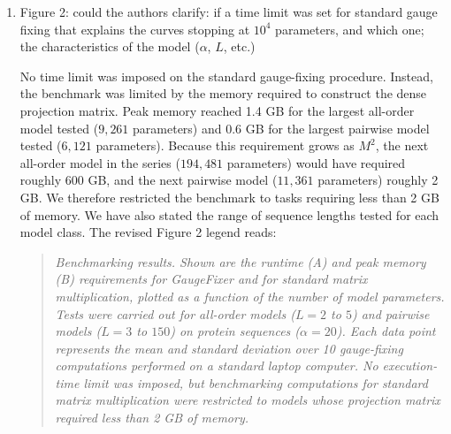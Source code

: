 \documentclass[11pt]{article}
\newenvironment{response}{\par\color{responseblue}}{\par}
\newenvironment{msquote}
  {\begin{quote}\color{responseblue}\itshape\noindent\ignorespaces}
  {\end{quote}}
\begin{document}
\begin{enumerate}
\begin{response}
We have revised the Discussion to emphasize this point:
\end{response}

\begin{msquote}
Although GaugeFixer operates only on specific classes of linear models
(all-order and hierarchical models), it can still be used to characterize
nonparametric or nonlinear models (e.g., Gaussian process models or deep neural
networks). To do this, one first evaluates the model of interest on every
possible sequence. The resulting landscape is then represented as an all-order
model, and GaugeFixer is applied to the corresponding parameters. This is what we
did for the Shine-Dalgarno landscape analyzed above (Figure 3). Because this
approach requires explicitly representing the combinatorially complete
landscape, it can be used only when sequences are short enough for that to be
computationally feasible. We note that recent theoretical results, however,
suggest a way of overcoming this limitation for certain Gaussian process models
\citep{Petti2025aa}.
\end{msquote}

\item Figure 2: could the authors clarify: if a time limit was set for standard
gauge fixing that explains the curves stopping at $10^4$ parameters, and which
one; the characteristics of the model ($\alpha$, $L$, etc.)

\begin{response}
No time limit was imposed on the standard gauge-fixing procedure. Instead, the
benchmark was limited by the memory required to construct the dense projection
matrix. Peak memory reached 1.4 GB for the largest all-order model tested
($9{,}261$ parameters) and 0.6 GB for the largest pairwise model tested
($6{,}121$ parameters). Because this requirement grows as $M^2$, the next
all-order model in the series ($194{,}481$ parameters) would have required
roughly 600 GB, and the next pairwise model ($11{,}361$ parameters) roughly 2 GB.
We therefore restricted the benchmark to tasks requiring less than 2 GB of
memory. We have also stated the range of sequence lengths tested for each model
class. The revised Figure 2 legend reads:
\end{response}

\begin{msquote}
Benchmarking results. Shown are the runtime (A) and peak memory (B) requirements
for GaugeFixer and for standard matrix multiplication, plotted as a function of
the number of model parameters. Tests were carried out for all-order models
($L=2$ to $5$) and pairwise models ($L=3$ to $150$) on protein sequences
($\alpha=20$). Each
data point represents the mean and standard deviation over 10 gauge-fixing
computations performed on a standard laptop computer. No execution-time limit was
imposed, but benchmarking computations for standard matrix multiplication were
restricted to models whose projection matrix required less than 2 GB of memory.
\end{msquote}


\end{enumerate}
\end{document}
